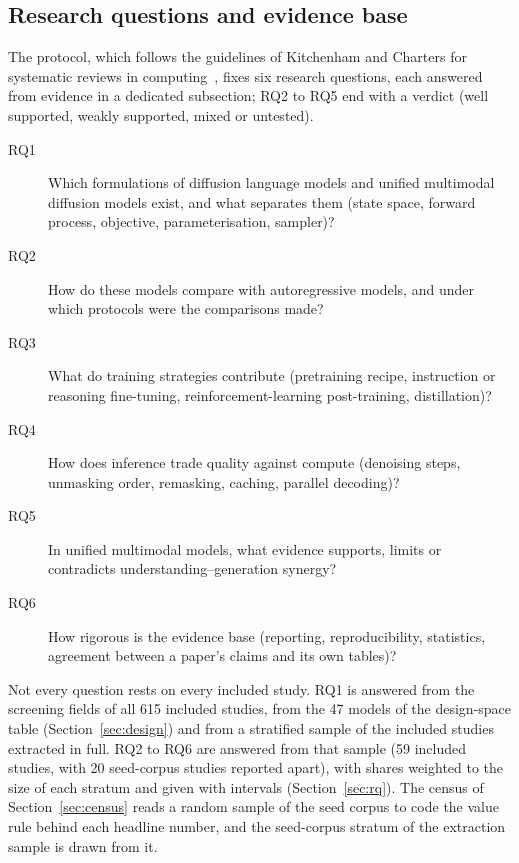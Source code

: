 \subsection{Research questions and evidence base}
\label{sec:intro-rq}

The protocol, which follows the guidelines of Kitchenham and Charters for systematic reviews in computing~\cite{kitchenham2007guidelines}, fixes six research questions, each answered from evidence in a dedicated subsection; RQ2 to RQ5 end with a verdict (well supported, weakly supported, mixed or untested). %
\begin{description}
  \item[RQ1] Which formulations of diffusion language models and unified multimodal diffusion models exist, and what separates them (state space, forward process, objective, parameterisation, sampler)?
  \item[RQ2] How do these models compare with autoregressive models, and under which protocols were the comparisons made?
  \item[RQ3] What do training strategies contribute (pretraining recipe, instruction or reasoning fine-tuning, reinforcement-learning post-training, distillation)?
  \item[RQ4] How does inference trade quality against compute (denoising steps, unmasking order, remasking, caching, parallel decoding)?
  \item[RQ5] In unified multimodal models, what evidence supports, limits or contradicts understanding--generation synergy?
  \item[RQ6] How rigorous is the evidence base (reporting, reproducibility, statistics, agreement between a paper's claims and its own tables)?
\end{description}

Not every question rests on every included study. RQ1 is answered from the screening fields of all 615 included studies, from the 47 models of the design-space table (Section~\ref{sec:design}) and from a stratified sample of the included studies extracted in full. RQ2 to RQ6 are answered from that sample (59 included studies, with 20 seed-corpus studies reported apart), with shares weighted to the size of each stratum and given with intervals (Section~\ref{sec:rq}). The census of Section~\ref{sec:census} reads a random sample of the seed corpus to code the value rule behind each headline number, and the seed-corpus stratum of the extraction sample is drawn from it. %

